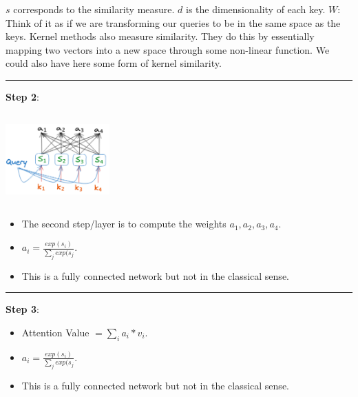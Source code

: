 \documentclass{article}
\begin{document}
$s$ corresponds to the similarity measure. $d$ is the dimensionality of each key. $W$: Think of it as if we are transforming our queries to be in the same space as the keys. Kernel methods also measure similarity. They do this by essentially mapping two vectors into a new space through some non-linear function. We could also have here some form of kernel similarity.  \\
\hrule
\textbf{Step 2}:\\
\begin{minipage}{0.5\textwidth}
\includegraphics[width=4cm, height=3.5cm]{Transformer/Images/Attention3.png}

\end{minipage}
\begin{minipage}{0.5\textwidth}
\begin{itemize}
    \item The second step/layer is to compute the weights $a_1,a_2,a_3,a_4$.
    \item $a_i = \frac{exp(s_i)}{\sum_j exp(s_j}$. 
    \item This is a fully connected network but not in the classical sense. 
\end{itemize}
\end{minipage}
\hrule 
\textbf{Step 3}:\\
\begin{minipage}{0.5\textwidth}

\begin{itemize}
    \item Attention Value $= \sum_i a_i * v_i$.
    \item $a_i = \frac{exp(s_i)}{\sum_j exp(s_j}$. 
    \item This is a fully connected network but not in the classical sense. 
\end{itemize}
\end{minipage}
\end{document}
